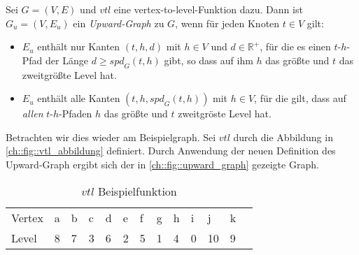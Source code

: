\begin{definition}\label{people:def:upward_graph}
  Sei $G = (V, E)$ und ${vtl}$ eine vertex-to-level-Funktion dazu.
  Dann ist $G_u = (V, E_u)$ ein \emph{Upward-Graph} zu $G$, wenn für jeden Knoten $t \in V$ gilt:

  \begin{itemize}
    \item
          $E_u$ enthält nur Kanten $(t, h, d)$ mit $h \in V$ und $d \in \mathbb{R}^+$, für die es einen $t$-$h$-Pfad der Länge $d \geq {spd}_G (t, h)$ gibt, so dass auf ihm $h$ das größte und $t$ das zweitgrößte Level hat.

    \item
          $E_u$ enthält alle Kanten $(t, h, {spd}_G (t, h))$ mit $h \in V$, für die gilt, dass auf \emph{allen} $t$-$h$-Pfaden $h$ das größte und $t$ zweitgröste Level hat.
  \end{itemize}
\end{definition}

Betrachten wir dies wieder am Beispielgraph.
Sei ${vtl}$ durch die Abbildung in \autoref{ch::fig::vtl_abbildung} definiert.
Durch Anwendung der neuen Definition des Upward-Graph ergibt sich der in \autoref{ch::fig::upward_graph} gezeigte Graph.

\begin{table}[ht]
  \centering
  \begin{tabular}{lllllllllllll}
    Vertex & a & b & c & d & e & f & g & h & i & j  & k & \\
    Level  & 8 & 7 & 3 & 6 & 2 & 5 & 1 & 4 & 0 & 10 & 9 &
  \end{tabular}
  \caption{${vtl}$ Beispielfunktion}
  \label{ch::fig::vtl_abbildung}
\end{table}

